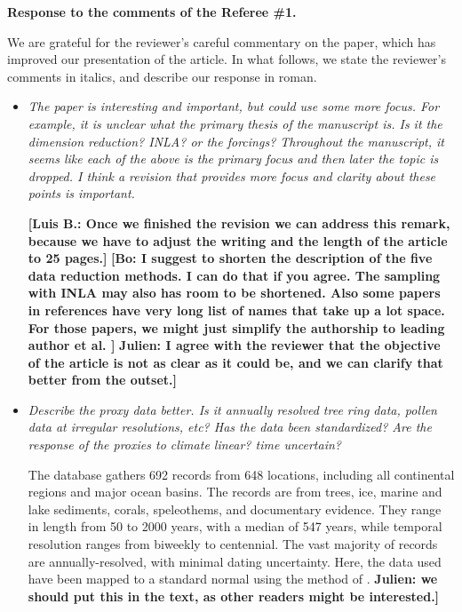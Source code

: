 \documentclass[11pt]{article}
\newcommand{\lb}[1]{\color{ForestGreen}\textbf{[Luis B.: #1]}\normalcolor}
\newcommand{\bl}[1]{\color{red}\textbf{[Bo: #1]}\normalcolor}
\newcommand{\jeg}[1]{\color{blue}\textbf{Julien: #1]}\normalcolor}
\begin{document}
\begin{center}
  {\Large \textbf{Response to the comments of the Referee \#1.}}
\end{center}

We are grateful for the reviewer's careful commentary on the paper, which has improved
our presentation of the article. In what follows, we state the reviewer's
comments in italics, and describe our response in roman.

\begin{itemize}
\item \textit{The paper is interesting and important, but could use some more
focus. For example, it is unclear what the primary thesis of the manuscript is.
Is it the dimension reduction? INLA? or the forcings? Throughout the manuscript,
it seems like each of the above is the primary focus and then later the topic is
dropped. I think a revision that provides more focus and clarity about these
points is important.
}

  \lb{Once we finished the revision we can address this remark, because we have
    to adjust the writing and the length of the article to 25 pages.}
  \bl{I suggest to shorten the description of the five data reduction methods. I can do that if you agree. The sampling with INLA may also has room to be shortened. Also some papers in references have very long list of names that take up a lot space. For those papers, we might just simplify the authorship to leading author et al. }
  \jeg{I agree with the reviewer that the objective of the article is not as clear as it could be, and we can clarify that better from the outset.}
  
\item \textit{Describe the proxy data better. Is it annually resolved tree ring
    data, pollen data at irregular resolutions, etc? Has the data been
    standardized? Are the response of the proxies to climate linear? time
    uncertain?}

  The database gathers 692 records from 648 locations, including all continental regions and major ocean basins. The records are from trees, ice, marine and lake sediments, corals, speleothems, and documentary evidence. They range in length from 50 to 2000 years, with a median of 547 years, while temporal resolution ranges from biweekly to centennial.
  The vast majority of records are annually-resolved, with minimal dating uncertainty. Here, the data used have been mapped to a standard normal using the method of \cite{vanAlbada2007}. \jeg{we should put this in the text, as other readers might be interested.}
  

\end{itemize}
\end{document}
